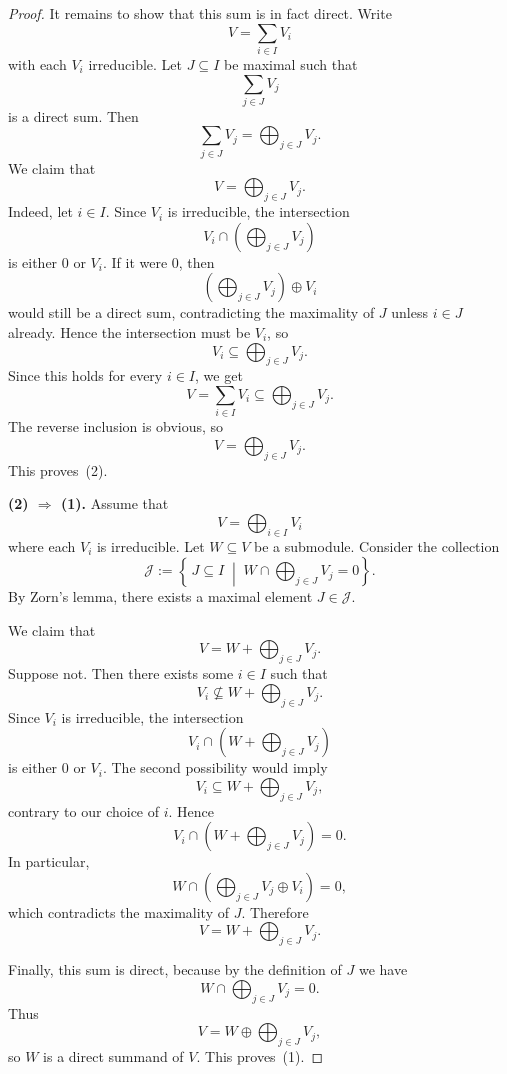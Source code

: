 \begin{proof}
    It remains to show that this sum is in fact direct.
    Write
    \[
        V=\sum_{i\in I} V_i
    \]
    with each $V_i$ irreducible.
    Let $J\subseteq I$ be maximal such that
    \[
        \sum_{j\in J} V_j
    \]
    is a direct sum.
    Then
    \[
        \sum_{j\in J} V_j=\bigoplus_{j\in J} V_j.
    \]
    We claim that
    \[
        V=\bigoplus_{j\in J} V_j.
    \]
    Indeed, let $i\in I$.
    Since $V_i$ is irreducible, the intersection
    \[
        V_i\cap \left(\bigoplus_{j\in J} V_j\right)
    \]
    is either $0$ or $V_i$.
    If it were $0$, then
    \[
        \left(\bigoplus_{j\in J} V_j\right)\oplus V_i
    \]
    would still be a direct sum, contradicting the maximality of $J$ unless $i\in J$ already.
    Hence the intersection must be $V_i$, so
    \[
        V_i\subseteq \bigoplus_{j\in J} V_j.
    \]
    Since this holds for every $i\in I$, we get
    \[
        V=\sum_{i\in I} V_i \subseteq \bigoplus_{j\in J} V_j.
    \]
    The reverse inclusion is obvious, so
    \[
        V=\bigoplus_{j\in J} V_j.
    \]
    This proves~(2).

    \medskip
    \noindent\textbf{(2) $\Rightarrow$ (1).}
    Assume that
    \[
        V=\bigoplus_{i\in I} V_i
    \]
    where each $V_i$ is irreducible.
    Let $W\subseteq V$ be a submodule.
    Consider the collection
    \[
        \mathcal{J}:=\left\{\, J\subseteq I \;\middle|\; W\cap \bigoplus_{j\in J} V_j =0 \right\}.
    \]
    By Zorn's lemma, there exists a maximal element $J\in\mathcal{J}$.

    We claim that
    \[
        V=W+\bigoplus_{j\in J} V_j.
    \]
    Suppose not.
    Then there exists some $i\in I$ such that
    \[
        V_i \nsubseteq W+\bigoplus_{j\in J} V_j.
    \]
    Since $V_i$ is irreducible, the intersection
    \[
        V_i\cap \left(W+\bigoplus_{j\in J} V_j\right)
    \]
    is either $0$ or $V_i$.
    The second possibility would imply
    \[
        V_i\subseteq W+\bigoplus_{j\in J} V_j,
    \]
    contrary to our choice of $i$.
    Hence
    \[
        V_i\cap \left(W+\bigoplus_{j\in J} V_j\right)=0.
    \]
    In particular,
    \[
        W\cap \left(\bigoplus_{j\in J} V_j \oplus V_i\right)=0,
    \]
    which contradicts the maximality of $J$.
    Therefore
    \[
        V=W+\bigoplus_{j\in J} V_j.
    \]

    Finally, this sum is direct, because by the definition of $J$ we have
    \[
        W\cap \bigoplus_{j\in J} V_j=0.
    \]
    Thus
    \[
        V=W\oplus \bigoplus_{j\in J} V_j,
    \]
    so $W$ is a direct summand of $V$.
    This proves~(1).
\end{proof}

